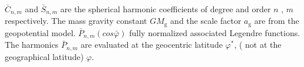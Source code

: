  $ \bar{C}_{n,m}$ and $ \bar{S}_{n,m}$ are the spherical harmonic coefficients of degree and order $ n$ , $ m$ respectively. The mass gravity constant $ GM_{\mathrm{g}}$ and the scale factor $ a_{\mathrm{g}}$ are from the geopotential model. $ \bar{P}_{n,m}(cos\bar{\varphi})$ fully normalized associated Legendre functions. The harmonics $ \bar{P}_{n,m}$ are evaluated at the geocentric latitude $ {\varphi}^{*}$, ( not at the geographical latitude) $ \varphi$. 



